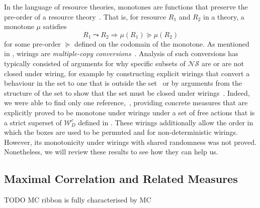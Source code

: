 \documentclass[10pt, a4paper]{article}
\numberwithin{equation}{section} %
\theoremstyle{definition}
\theoremstyle{plain}
\newcommand{\?}{\mathrel{?}} %
\newcommand{\sW}{\mathcal{W}}
\newcommand{\NSs}{\mathcal{NS}}
\begin{document}
    In the language of resource theories, monotones are functions that preserve the pre-order of a resource theory~\cite{BellResourceTheory}. That is, for resource \(R_1\) and \(R_2\) in a theory, a monotone \(\mu\) satisfies
    \begin{equation}
      R_1 \leadsto R_2 \Rightarrow \mu(R_1) \succeq \mu(R_2)
    \end{equation}
    for some pre-order \(\succeq\) defined on the codomain of the monotone. As mentioned in , wirings are \emph{multiple-copy conversions}~\cite{BellResourceTheory}. Analysis of such conversions has typically consisted of arguments for why specific subsets of \(\NSs\) are or are not closed under wiring, for example by constructing explicit wirings that convert a behaviour in the set to one that is outside the set~\cite{ClosedCorrSets} or by arguments from the structure of the set to show that the set must be closed under wirings~\cite{NonlocalZoo}. Indeed, we were able to find only one reference,~\cite{NLMonotones}, providing concrete measures that are explicitly proved to be monotone under wirings under a set of free actions that is a strict superset of \(\sW_D^c\) defined in . These wirings additionally allow the order in which the boxes are used to be permuted and for non-deterministic wirings. However, its monotonicity under wirings with shared randomness was not proved. Nonetheless, we will review these results to see how they can help us.

    \subsection{Maximal Correlation and Related Measures}\label{sec:nlmono_maxcorr}

    TODO MC ribbon is fully characterised by MC
\end{document}
